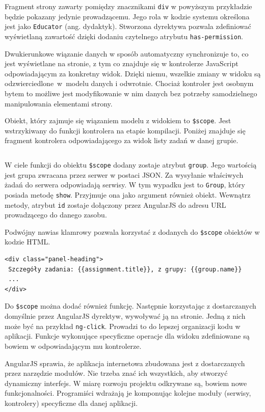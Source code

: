 \documentclass[wimgr]{xmgr}
\begin{document}
Fragment strony zawarty pomiędzy znacznikami \texttt{div} w powyższym przykładzie będzie pokazany jedynie prowadzącemu. Jego rola w kodzie systemu określona jest jako \texttt{Educator} (ang. dydaktyk). Stworzona dyrektywa pozwala zdefiniować wyświetlaną zawartość dzięki dodaniu czytelnego atrybutu \texttt{has-permission}.

Dwukierunkowe wiązanie danych w sposób automatyczny synchronizuje to, co jest wyświetlane na stronie, z tym co znajduje się w kontrolerze JavaScript odpowiadającym za konkretny widok. Dzięki niemu, wszelkie zmiany w widoku są odzwierciedlone~w~modelu danych i odwrotnie. Chociaż kontroler jest osobnym bytem to możliwe jest modyfikowanie w nim danych bez potrzeby samodzielnego manipulowania elementami strony.  

Obiekt, który zajmuje się wiązaniem modelu z widokiem to \texttt{\$scope}. Jest wstrzykiwany do funkcji kontrolera na etapie kompilacji. Poniżej znajduje się fragment kontrolera odpowiadającego za widok listy zadań w danej grupie.

\inputminted[fontsize=\small]{javascript}{code/angularController.js} 

W ciele funkcji do obiektu \texttt{\$scope} dodany zostaje atrybut \texttt{group}. Jego wartością jest grupa zwracana przez serwer w postaci JSON. Za wysyłanie właściwych żadań do serwera odpowiadają serwisy. W tym wypadku jest to \texttt{Group}, który posiada metodę \texttt{show}. Przyjmuje ona jako argument również obiekt. Wewnątrz metody, atrybut \texttt{id} zostaje dołączony przez AngularJS do adresu URL prowadzącego do danego zasobu.

Podwójny nawias klamrowy pozwala korzystać z dodanych do \texttt{\$scope} obiektów w kodzie HTML. 

\begin{verbatim}
<div class="panel-heading">
 Szczegóły zadania: {{assignment.title}}, z grupy: {{group.name}}
 ...
</div>
\end{verbatim}

Do \texttt{\$scope} można dodać również funkcję. Następnie korzystając z dostarczanych domyślnie przez AngularJS dyrektyw, wywoływać ją na stronie. Jedną z nich może być na przykład \texttt{ng-click}. Prowadzi to do lepszej organizacji kodu w aplikacji. Funkcje wykonujące specyficzne operacje dla widoku zdefiniowane są bowiem w odpowiadającym mu kontrolerze. 

AngularJS sprawia, że aplikacja internetowa zbudowana jest z dostarczanych przez narzędzie modułów. Nie trzeba znać ich wszystkich, aby stworzyć dynamiczny interfejs. W miarę rozwoju projektu odkrywane są, bowiem nowe funkcjonalności. Programiści wdrażają je komponując kolejne moduły (serwisy, kontrolery) specyficzne dla danej aplikacji.  
\end{document}
